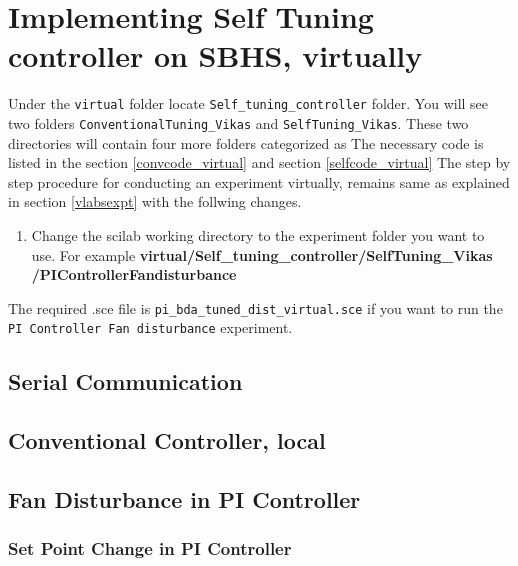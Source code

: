 \section{Implementing Self Tuning controller on SBHS, virtually}
Under the {\tt virtual} folder locate {\tt Self\_tuning\_controller} folder. You will see two folders {\tt ConventionalTuning\_Vikas} and {\tt SelfTuning\_Vikas}. These two directories will contain four more folders categorized as 
The necessary code is listed in the section \ref{convcode_virtual} and section \ref{selfcode_virtual}
The step by step procedure for conducting an experiment virtually, remains same as explained in section \ref{vlabsexpt} with the follwing changes.
\begin{enumerate}
\item Change the scilab working directory to the experiment folder you want to use. For example {\bf virtual/Self\_tuning\_controller/SelfTuning\_Vikas\\/PIControllerFandisturbance}
\end{enumerate}
 The required .sce 
file is {\tt pi\_bda\_tuned\_dist\_virtual.sce} if you want to run the {\tt PI Controller Fan disturbance} experiment.  



\subsection{Serial Communication}
\begin{code}

\end{code}


\subsection{Conventional Controller, local}\label{convcode_local}
\subsection{Fan Disturbance in PI Controller}
\begin{code}

\end{code}


\subsubsection{Set Point Change in PI Controller}
\begin{code}

\end{code}



